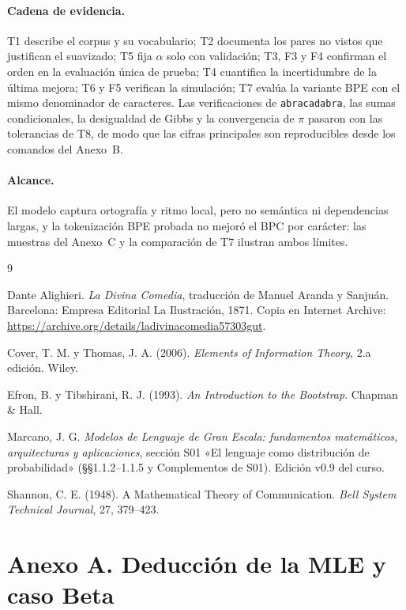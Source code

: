\documentclass[11pt,letterpaper]{article}
\begin{document}
	\paragraph{Cadena de evidencia.}
	T1 describe el corpus y su vocabulario; T2 documenta los pares no vistos que justifican el suavizado; T5 fija $\alpha$ solo con validación; T3, F3 y F4 confirman el orden en la evaluación única de prueba; T4 cuantifica la incertidumbre de la última mejora; T6 y F5 verifican la simulación; T7 evalúa la variante BPE con el mismo denominador de caracteres. Las verificaciones de \texttt{abracadabra}, las sumas condicionales, la desigualdad de Gibbs y la convergencia de $\pi$ pasaron con las tolerancias de T8, de modo que las cifras principales son reproducibles desde los comandos del Anexo~B.
	
	\paragraph{Alcance.}
	El modelo captura ortografía y ritmo local, pero no semántica ni dependencias largas, y la tokenización BPE probada no mejoró el BPC por carácter: las muestras del Anexo~C y la comparación de T7 ilustran ambos límites.
	
	\begin{thebibliography}{9}
		\item Dante Alighieri. \textit{La Divina Comedia}, traducción de Manuel Aranda y Sanjuán. Barcelona: Empresa Editorial La Ilustración, 1871. Copia en Internet Archive: \url{https://archive.org/details/ladivinacomedia57303gut}.
		\item Cover, T. M. y Thomas, J. A. (2006). \textit{Elements of Information Theory}, 2.a edición. Wiley.
		\item Efron, B. y Tibshirani, R. J. (1993). \textit{An Introduction to the Bootstrap}. Chapman \& Hall.
		\item Marcano, J. G. \textit{Modelos de Lenguaje de Gran Escala: fundamentos matemáticos, arquitecturas y aplicaciones}, sección S01 «El lenguaje como distribución de probabilidad» (\S\S 1.1.2--1.1.5 y Complementos de S01). Edición v0.9 del curso.
		\item Shannon, C. E. (1948). A Mathematical Theory of Communication. \textit{Bell System Technical Journal}, 27, 379--423.
	\end{thebibliography}
	
	\appendix
	\section*{Anexo A. Deducción de la MLE y caso Beta}
	
\end{document}

